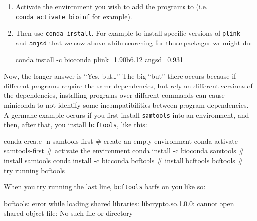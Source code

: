 \documentclass[]{krantz}
\makeatletter
\newenvironment{Shaded}{\begin{snugshade}}{\end{snugshade}}
\newcommand{\ExtensionTok}[1]{#1}
\newcommand{\NormalTok}[1]{#1}
\newenvironment{kframe}{%
\medskip{}
\setlength{\fboxsep}{.8em}
 \def\at@end@of@kframe{}%
 \ifinner\ifhmode%
  \def\at@end@of@kframe{\end{minipage}}%
  \begin{minipage}{\columnwidth}%
 \fi\fi%
 \def\FrameCommand##1{\hskip\@totalleftmargin \hskip-\fboxsep
 \colorbox{shadecolor}{##1}\hskip-\fboxsep
     \hskip-\linewidth \hskip-\@totalleftmargin \hskip\columnwidth}%
 \MakeFramed {\advance\hsize-\width
   \@totalleftmargin\z@ \linewidth\hsize
   \@setminipage}}%
 {\par\unskip\endMakeFramed%
 \at@end@of@kframe}
\renewenvironment{Shaded}{\begin{kframe}}{\end{kframe}}
\makeatother
\begin{document}
\begin{enumerate}
\def\labelenumi{\arabic{enumi}.}
\item
  Activate the environment you wish to add the programs to (i.e. \texttt{conda\ activate\ bioinf} for example).
\item
  Then use \texttt{conda\ install}. For example to install specific versions of \texttt{plink} and \texttt{angsd} that we
  saw above while searching for those packages we might do:

\begin{Shaded}
\begin{Highlighting}[]
\ExtensionTok{conda}\NormalTok{ install -c bioconda plink=1.90b6.12 angsd=0.931}
\end{Highlighting}
\end{Shaded}
\end{enumerate}

Now, the longer answer is ``Yes, but\ldots{}'' The big ``but'' there occurs because if different
programs require the same dependencies, but rely on different versions of the dependencies,
installing programs over different commands can cause miniconda to not identify some
incompatibilities between program dependencies. A germane example occurs if you first install
\texttt{samtools} into an environment, and then, after that, you install \texttt{bcftools}, like this:

\begin{Shaded}
\begin{Highlighting}[]
\ExtensionTok{conda}\NormalTok{ create -n samtools-first        # create an empty environment}
\ExtensionTok{conda}\NormalTok{ activate samtools-first         # activate the environment}
\ExtensionTok{conda}\NormalTok{ install -c bioconda samtools    # install samtools}
\ExtensionTok{conda}\NormalTok{ install -c bioconda bcftools    # install bcftools}
\ExtensionTok{bcftools}\NormalTok{                              # try running bcftools}
\end{Highlighting}
\end{Shaded}

When you try running the last line, \texttt{bcftools} barfs on you like so:

\begin{Shaded}
\begin{Highlighting}[]
\ExtensionTok{bcftools}\NormalTok{: error while loading shared libraries: libcrypto.so.1.0.0: cannot open shared object file: No such file or directory}
\end{Highlighting}
\end{Shaded}
\end{document}

